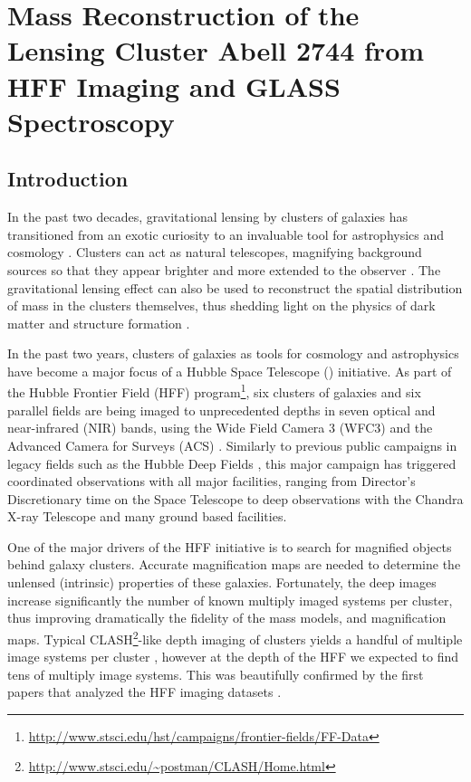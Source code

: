 
\chapter{Mass Reconstruction of the Lensing Cluster Abell 2744 from HFF Imaging and GLASS Spectroscopy}


\section{Introduction}
\label{sec:intro}

In the past two decades, gravitational lensing by clusters of galaxies has transitioned from an exotic curiosity to an invaluable 
tool for astrophysics and cosmology \cite[e.g.][]{K+N11}. Clusters can act as natural telescopes, magnifying background sources so 
that they appear brighter and more extended to the observer \cite[e.g.][]{Yee++96,Pet++02,Bradac:2012p28826,Shi++14,Bay++14}.  The 
gravitational lensing effect can also be used to reconstruct the spatial distribution of mass in the clusters themselves, thus 
shedding light on the physics of dark matter and structure formation 
\citep[e.g.][]{clowe06,Bra++06,San++08,New++13,Sha++14,2015ApJ...806....4M}.

In the past two years, clusters of galaxies as tools for cosmology and
astrophysics have become a major focus of a Hubble Space Telescope
(\hst) initiative. As part of the Hubble Frontier Field (HFF) program\footnote{\url{http://www.stsci.edu/hst/campaigns/frontier-fields/FF-Data}},
six clusters of galaxies and six parallel fields are being imaged to
unprecedented depths in seven optical and near-infrared (NIR) bands, using
the Wide Field Camera 3 (WFC3) and the Advanced Camera for Surveys
(ACS) \citep{2015ApJ...800...84C}. Similarly to previous public campaigns in
legacy fields such as the Hubble Deep Fields
\citep{Wil++96,Ferguson:2000p22537}, this major \hst campaign has
triggered coordinated observations with all major facilities, ranging
from Director's Discretionary time on the \spitzer Space Telescope to
deep observations with the Chandra X-ray Telescope and many ground
based facilities.

One of the major drivers of the HFF initiative is to search for
magnified objects behind galaxy clusters. Accurate magnification maps
are needed to determine the unlensed (intrinsic) properties of these
galaxies. Fortunately, the deep images increase significantly the
number of known multiply imaged systems per cluster, thus improving
dramatically the fidelity of the mass models, and magnification
maps. Typical CLASH\footnote{\url{http://www.stsci.edu/~postman/CLASH/Home.html}}-like depth imaging of clusters
\citep[limiting magnitude $\sim$ 27 ABmag for a 5-$\sigma$ point
source][]{Postman:2012p27556} yields a handful of multiple image
systems per cluster \cite[e.g.][]{Joh++14}, however at the depth of the HFF
we expected to find tens of multiply image systems. This was
beautifully confirmed by the first papers that analyzed the HFF
imaging datasets
\citep[e.g.][]{2014arXiv1409.8663J,Ish++15,Lap++15}.

